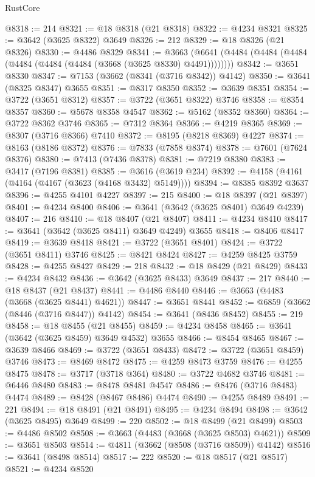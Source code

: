 \begin{lexlean}{RustCore}
\begin{coremodule}
@8318 := 214
@8321 := @18 @8318 (@21 @8318)
@8322 := @4234 @8321
@8325 := @3642 (@3625 @8322) @3649
@8326 := 212
@8329 := @18 @8326 (@21 @8326)
@8330 := @4486 @8329
@8341 := @3663 (@6641 (@4484 (@4484 (@4484 (@4484 (@4484 (@4484 (@3668 (@3625 @8330) @4491))))))))
@8342 := @3651 @8330
@8347 := @7153 (@3662 (@8341 (@3716 @8342)) @4142)
@8350 := @3641 (@8325 @8347) @3655
@8351 := @8317 @8350
@8352 := @3639 @8351
@8354 := @3722 (@3651 @8312)
@8357 := @3722 (@3651 @8322) @3746
@8358 := @8354 @8357
@8360 := @5678 @8358 @4547
@8362 := @5162 (@8352 @8360)
@8364 := @3722 @8362 @3746
@8365 := @7312 @8364
@8366 := @4219 @8365
@8369 := @8307 (@3716 @8366) @7410
@8372 := @8195 (@8218 @8369) @4227
@8374 := @8163 (@8186 @8372)
@8376 := @7833 (@7858 @8374)
@8378 := @7601 (@7624 @8376)
@8380 := @7413 (@7436 @8378)
@8381 := @7219 @8380
@8383 := @3417 (@7196 @8381)
@8385 := @3616 (@3619 @234)
@8392 := @4158 (@4161 (@4164 (@4167 (@3623 (@4168 @3432) @5149))))
@8394 := @8385 @8392 @3637
@8396 := @4255 @4101 @4227
@8397 := 215
@8400 := @18 @8397 (@21 @8397)
@8401 := @4234 @8400
@8406 := @3641 (@3642 (@3625 @8401) @3649 @4239)
@8407 := 216
@8410 := @18 @8407 (@21 @8407)
@8411 := @4234 @8410
@8417 := @3641 (@3642 (@3625 @8411) @3649 @4249) @3655
@8418 := @8406 @8417
@8419 := @3639 @8418
@8421 := @3722 (@3651 @8401)
@8424 := @3722 (@3651 @8411) @3746
@8425 := @8421 @8424
@8427 := @4259 @8425 @3759
@8428 := @4255 @8427
@8429 := 218
@8432 := @18 @8429 (@21 @8429)
@8433 := @4234 @8432
@8436 := @3642 (@3625 @8433) @3649
@8437 := 217
@8440 := @18 @8437 (@21 @8437)
@8441 := @4486 @8440
@8446 := @3663 (@4483 (@3668 (@3625 @8441) @4621))
@8447 := @3651 @8441
@8452 := @6859 (@3662 (@8446 (@3716 @8447)) @4142)
@8454 := @3641 (@8436 @8452)
@8455 := 219
@8458 := @18 @8455 (@21 @8455)
@8459 := @4234 @8458
@8465 := @3641 (@3642 (@3625 @8459) @3649 @4532) @3655
@8466 := @8454 @8465
@8467 := @3639 @8466
@8469 := @3722 (@3651 @8433)
@8472 := @3722 (@3651 @8459) @3746
@8473 := @8469 @8472
@8475 := @4259 @8473 @3759
@8476 := @4255 @8475
@8478 := @3717 (@3718 @364)
@8480 := @3722 @4682 @3746
@8481 := @6446 @8480
@8483 := @8478 @8481 @4547
@8486 := @8476 (@3716 @8483) @4474
@8489 := @8428 (@8467 @8486) @4474
@8490 := @4255 @8489
@8491 := 221
@8494 := @18 @8491 (@21 @8491)
@8495 := @4234 @8494
@8498 := @3642 (@3625 @8495) @3649
@8499 := 220
@8502 := @18 @8499 (@21 @8499)
@8503 := @4486 @8502
@8508 := @3663 (@4483 (@3668 (@3625 @8503) @4621))
@8509 := @3651 @8503
@8514 := @4811 (@3662 (@8508 (@3716 @8509)) @4142)
@8516 := @3641 (@8498 @8514)
@8517 := 222
@8520 := @18 @8517 (@21 @8517)
@8521 := @4234 @8520

\end{coremodule}
\end{lexlean}
